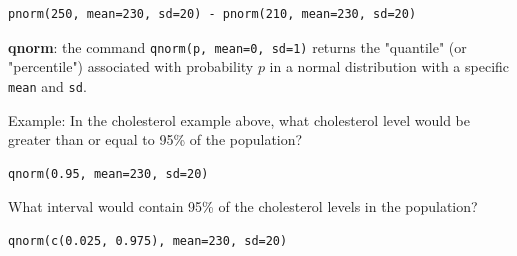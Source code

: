 \documentclass[11pt]{article}
\begin{document}
\begin{verbatim}
pnorm(250, mean=230, sd=20) - pnorm(210, mean=230, sd=20)
\end{verbatim}


\textbf{qnorm}: the command \texttt{qnorm(p, mean=0, sd=1)} returns the "quantile" (or "percentile") associated with probability $p$ in a normal distribution with a specific \texttt{mean} and \texttt{sd}.

Example:  In the cholesterol example above, what cholesterol level would be greater than or equal to 95\% of the population?

\begin{verbatim}
qnorm(0.95, mean=230, sd=20)
\end{verbatim}

What interval would contain 95\% of the cholesterol levels in the population?

\begin{verbatim}
qnorm(c(0.025, 0.975), mean=230, sd=20)
\end{verbatim}
\end{document}
